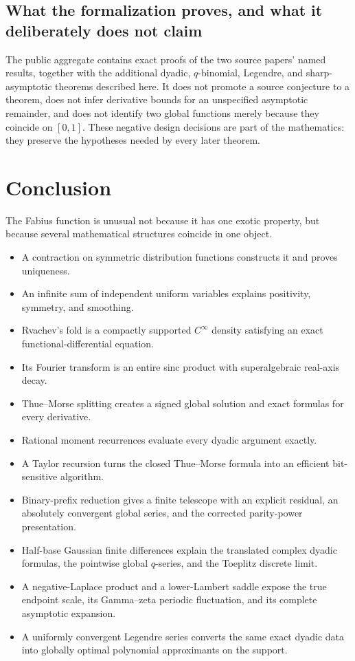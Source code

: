 \documentclass[11pt,oneside]{article}
\theoremstyle{definition}
\theoremstyle{remark}
\begin{document}
\subsection{What the formalization proves, and what it deliberately does not claim}

The public aggregate contains exact proofs of the two source papers' named results, together
with the additional dyadic, $q$-binomial, Legendre, and sharp-asymptotic theorems described
here.  It does not promote a source conjecture to a theorem, does not infer derivative bounds
for an unspecified asymptotic remainder, and does not identify two global functions merely
because they coincide on $[0,1]$.  These negative design decisions are part of the
mathematics: they preserve the hypotheses needed by every later theorem.

\section{Conclusion}
\label{sec:conclusion}

The Fabius function is unusual not because it has one exotic property, but because several
mathematical structures coincide in one object.

\begin{itemize}
\item A contraction on symmetric distribution functions constructs it and proves uniqueness.
\item An infinite sum of independent uniform variables explains positivity, symmetry, and
      smoothing.
\item Rvachev's fold is a compactly supported $C^\infty$ density satisfying an exact
      functional-differential equation.
\item Its Fourier transform is an entire sinc product with superalgebraic real-axis decay.
\item Thue--Morse splitting creates a signed global solution and exact formulas for every
      derivative.
\item Rational moment recurrences evaluate every dyadic argument exactly.
\item A Taylor recursion turns the closed Thue--Morse formula into an efficient
      bit-sensitive algorithm.
\item Binary-prefix reduction gives a finite telescope with an explicit residual, an
      absolutely convergent global series, and the corrected parity-power presentation.
\item Half-base Gaussian finite differences explain the translated complex dyadic formulas,
      the pointwise global $q$-series, and the Toeplitz discrete limit.
\item A negative-Laplace product and a lower-Lambert saddle expose the true endpoint scale,
      its Gamma--zeta periodic fluctuation, and its complete asymptotic expansion.
\item A uniformly convergent Legendre series converts the same exact dyadic data into
      globally optimal polynomial approximants on the support.
\end{itemize}
\end{document}
